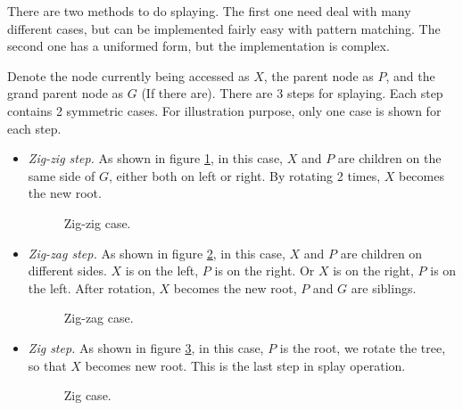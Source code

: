 \documentclass[b5paper]{article}
\begin{document}
There are two methods to do splaying. The first one need deal
with many different cases, but can be implemented fairly easy with
pattern matching. The second one has a uniformed form, but the implementation
is complex.

Denote the node currently being accessed as $X$, the parent node as $P$,
and the grand parent node as $G$ (If there are).  There are 3 steps for
splaying. Each step contains 2 symmetric cases. For illustration
purpose, only one case is shown for each step.

\begin{itemize}
\item {\em Zig-zig step.} As shown in figure \ref{fig:zig-zig}, in this case,
$X$ and $P$ are children on the same side of $G$, either both on left or right. By
rotating 2 times, $X$ becomes the new root.

\begin{figure}[htbp]
  \centering
  \caption{Zig-zig case.} \label{fig:zig-zig}
\end{figure}

\item {\em Zig-zag step.} As shown in figure \ref{fig:zig-zag}, in this
case, $X$ and $P$ are children on different sides. $X$ is on the left,
$P$ is on the right. Or $X$ is on the right, $P$ is on the left.
After rotation, $X$ becomes the new root, $P$ and $G$ are siblings.

\begin{figure}[htbp]
  \centering
  \caption{Zig-zag case.} \label{fig:zig-zag}
\end{figure}

\item {\em Zig step.} As shown in figure \ref{fig:zig}, in this case,
$P$ is the root, we rotate the tree, so that $X$ becomes new root.
This is the last step in splay operation.

\begin{figure}[htbp]
  \centering
  \caption{Zig case.} \label{fig:zig}
\end{figure}

\end{itemize}
\end{document}
